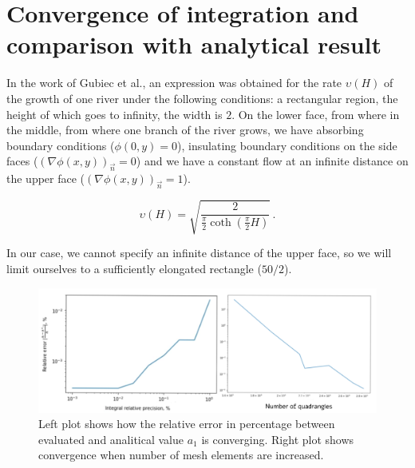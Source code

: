 \documentclass[]{pracamgr}
\begin{document}
    \section{Convergence of integration and comparison with analytical result}

    In the work of Gubiec et al.\cite{gubiec2008fingered}, an expression was obtained for the rate $\upsilon(H)$ of the growth of one river under the following conditions: a rectangular region, the height of which goes to infinity, the width is $2$. On the lower face, from where in the middle, from where one branch of the river grows, we have absorbing boundary conditions ($\phi(0, y) = 0$), insulating boundary conditions on the side faces ($(\nabla \phi(x, y))_{ \vec{n}} = 0$) and we have a constant flow at an infinite distance on the upper face ($(\nabla \phi(x, y))_{\vec{n}} = 1$).

    \begin{equation}
      \label{velocity_analytical}
      \upsilon(H) = \sqrt{\frac{2}{\frac{\pi}{2}\coth(\frac{\pi}{2}H)}} \,.
    \end{equation}
    
    In our case, we cannot specify an infinite distance of the upper face, so we will limit ourselves to a sufficiently elongated rectangle ($50/2$).

    \begin{figure}[H]
      \centering
      \includegraphics[width=1\textwidth]{figs/convergence.png}        
      \caption{Left plot shows how the relative error in percentage between evaluated and analitical value $a_1$ is converging. Right plot shows convergence when number of mesh elements are increased.}
      \label{convergence_new}
    \end{figure}
\end{document}
